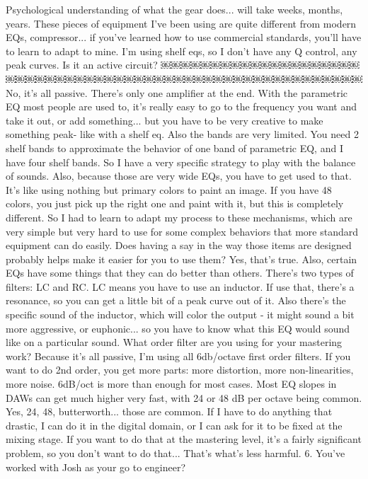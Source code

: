 Psychological understanding of what the gear does... will take weeks, months, years. These pieces of equipment I've been using are quite different from modern EQs, compressor... if you've learned how to use commercial standards, you'll have to learn to adapt to mine. I'm using shelf eqs, so I don't have any Q control, any peak curves.
Is it an active circuit?
￼￼￼￼￼￼￼￼￼￼￼￼￼￼￼￼￼￼￼￼￼￼￼￼￼￼￼￼￼￼￼￼￼￼￼￼￼￼￼￼￼￼￼￼￼￼￼￼￼￼￼￼￼￼￼￼
No, it's all passive. There's only one amplifier at the end. With the parametric EQ most people are used to, it's really easy to go to the frequency you want and take it out, or add something... but you have to be very creative to make something peak- like with a shelf eq. Also the bands are very limited. You need 2 shelf bands to approximate the behavior of one band of parametric EQ, and I have four shelf bands. So I have a very specific strategy to play with the balance of sounds. Also, because those are very wide EQs, you have to get used to that. It's like using nothing but primary colors to paint an image. If you have 48 colors, you just pick up the right one and paint with it, but this is completely different. So I had to learn to adapt my process to these mechanisms, which are very simple but very hard to use for some complex behaviors that more standard equipment can do easily.
Does having a say in the way those items are designed probably helps make it easier for you to use them?
Yes, that's true. Also, certain EQs have some things that they can do better than others. There's two types of filters: LC and RC. LC means you have to use an inductor. If use that, there's a resonance, so you can get a little bit of a peak curve out of it. Also there's the specific sound of the inductor, which will color the output - it might sound a bit more aggressive, or euphonic... so you have to know what this EQ would sound like on a particular sound.
What order filter are you using for your mastering work?
Because it's all passive, I'm using all 6db/octave first order filters. If you want to do 2nd order, you get more parts: more distortion, more non-linearities, more noise. 6dB/oct is more than enough for most cases.
Most EQ slopes in DAWs can get much higher very fast, with 24 or 48 dB per octave being common.
Yes, 24, 48, butterworth... those are common. If I have to do anything that drastic, I can do it in the digital domain, or I can ask for it to be fixed at the mixing stage. If you want to do that at the mastering level, it's a fairly significant problem, so you don't want to do that... That's what's less harmful.
6. You've worked with Josh as your go to engineer?
